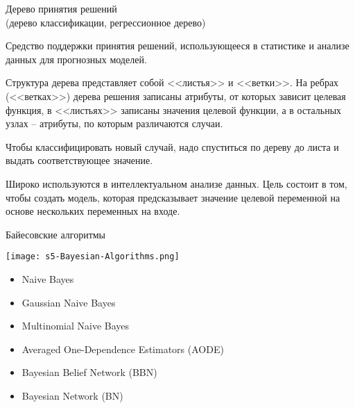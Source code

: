 \documentclass[pdf, intlimits, 9pt, unicode]{beamer}
\begin{document}
\begin{frame}{Дерево принятия решений\\(дерево классификации, регрессионное дерево)}

\small
Средство поддержки принятия решений, использующееся в статистике и анализе данных для прогнозных моделей.\pause

Структура дерева представляет собой {\color{red}<<листья>> и <<ветки>>}. \pause На ребрах (<<ветках>>) дерева решения записаны атрибуты, от которых зависит целевая функция, в <<листьях>> записаны значения целевой функции, а в остальных узлах -- атрибуты, по которым различаются случаи.\pause 

Чтобы классифицировать {\color{red}новый случай}, надо спуститься по дереву до листа и выдать соответствующее значение.\pause 

Широко используются в интеллектуальном анализе данных. \pause Цель состоит в том, чтобы создать модель, которая предсказывает значение целевой переменной на основе нескольких переменных на входе.

\end{frame}




\begin{frame}{Байесовские алгоритмы}

\begin{center}\texttt{[image: s5-Bayesian-Algorithms.png]}\end{center}

\begin{itemize}
\item Naive Bayes
\item Gaussian Naive Bayes
\item Multinomial Naive Bayes
\item Averaged One-Dependence Estimators (AODE)
\item Bayesian Belief Network (BBN)
\item Bayesian Network (BN)
\end{itemize}

\end{frame}
\end{document}
